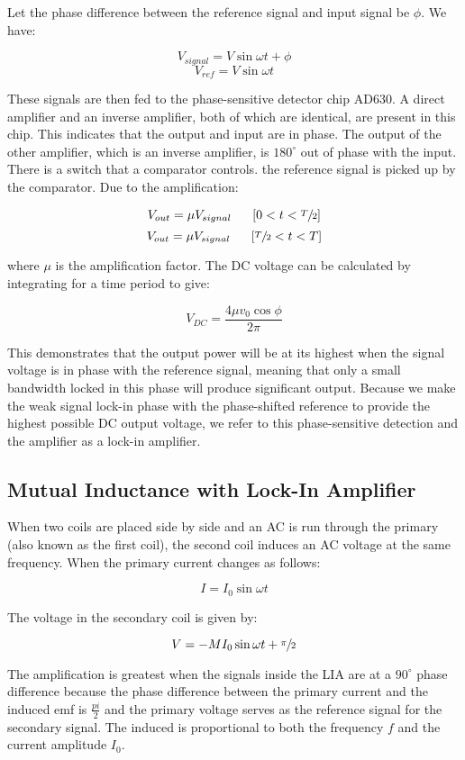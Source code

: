 		Let the phase difference between the reference signal and input signal be $\phi$. We have:


		$$V_{signal} = V\sin\omega t + \phi$$
		$$V_{ref} = V\sin\omega t$$
		
		These signals are then fed to the phase-sensitive detector chip AD630. A direct amplifier and an inverse amplifier, both of which are identical, are present in this chip. This indicates that the output and input are in phase. The output of the other amplifier, which is an inverse amplifier, is $180^\circ$ out of phase with the input. There is a switch that a comparator controls. the reference signal is picked up by the comparator. Due to the amplification:
		
		$$V_{out} = \mu V_{signal} \;\;\;\;\;\; [0<t<\sfrac{T}{2}]$$
		$$V_{out} = \mu V_{signal} \;\;\;\;\;\; [\sfrac{T}{2}<t<T]$$

		where $\mu$ is the amplification factor. The DC voltage can be calculated by integrating for a time period to give:

		$$V_{DC} = \frac{4\mu v_0 \cos\phi}{2\pi}$$

		This demonstrates that the output power will be at its highest when the signal voltage is in phase with the reference signal, meaning that only a small bandwidth locked in this phase will produce significant output. Because we make the weak signal lock-in phase with the phase-shifted reference to provide the highest possible DC output voltage, we refer to this phase-sensitive detection and the amplifier as a lock-in amplifier.
	
	\subsection{Mutual Inductance with Lock-In Amplifier}
		When two coils are placed side by side and an AC is run through the primary (also known as the first coil), the second coil induces an AC voltage at the same frequency. When the primary current changes as follows:

		$$I = I_0 \sin\omega t$$

		The voltage in the secondary coil is given by:

		$$V = -MI_0\sin\omega t + \sfrac{\pi}{2}$$

		The amplification is greatest when the signals inside the LIA are at a $90^\circ$ phase difference because the phase difference between the primary current and the induced emf is $\frac{pi}{2}$ and the primary voltage serves as the reference signal for the secondary signal. The induced is proportional to both the frequency $f$ and the current amplitude $I_0$.

